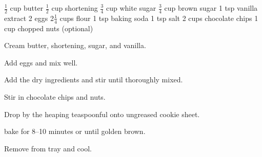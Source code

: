 \dishtype{}
\begin{ingreds}
    $\frac{1}{2}$ cup butter
    $\frac{1}{2}$ cup shortening
    $\frac{3}{4}$ cup white sugar
    $\frac{3}{4}$ cup brown sugar
    1 tsp vanilla extract
    2 eggs
    2$\frac{1}{4}$ cups flour
    1 tsp baking soda
    1 tsp salt
    2 cups chocolate chips
    1 cup chopped nuts (optional)
\end{ingreds}
\begin{method}
    Cream butter, shortening, sugar, and vanilla.\par
    Add eggs and mix well.\par
    Add the dry ingredients and stir until thoroughly mixed.\par
    Stir in chocolate chips and nuts.\par
    Drop by the heaping teaspoonful onto ungreased cookie sheet.\par
    bake for 8--10 minutes or until golden brown.\par
    Remove from tray and cool.
\end{method}